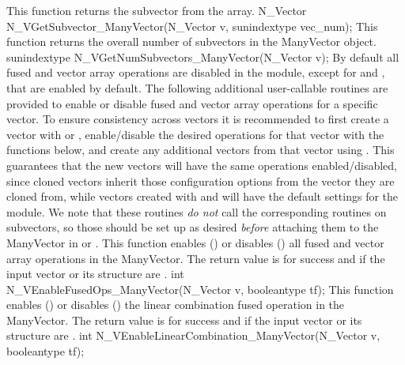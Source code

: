 {
  This function returns the  subvector from the {\nvector}
   array.
}
{
  N\_Vector N\_VGetSubvector\_ManyVector(N\_Vector v, sunindextype vec\_num);
}
{
  This function returns the overall number of subvectors in the
  ManyVector object.
}
{
  sunindextype N\_VGetNumSubvectors\_ManyVector(N\_Vector v);
}
By default all fused and vector array operations are disabled in the {\nvecmanyvector}
module, except for  and
, that are enabled by default. The
following additional user-callable routines are provided to enable or
disable fused and vector array operations for a specific vector. To
ensure consistency across vectors it is recommended to first create a
vector with  or ,
enable/disable the desired operations for that vector with the
functions below, and create any additional vectors from that vector
using . This guarantees that the new vectors will have
the same operations enabled/disabled, since cloned vectors inherit
those configuration options from the vector they are cloned from, while
vectors created with  and
 will have the default settings for the
{\nvecmanyvector} module.  We note that these routines \emph{do not} 
call the corresponding routines on subvectors, so those should be set up
as desired \emph{before} attaching them to the ManyVector in
 or .
{
  This function enables () or disables () all fused and
  vector array operations in the ManyVector. The return value is  for
  success and  if the input vector or its  structure are .
}
{
  int N\_VEnableFusedOps\_ManyVector(N\_Vector v, booleantype tf);
}
{
  This function enables () or disables () the linear
  combination fused operation in the ManyVector. The return value is  for
  success and  if the input vector or its  structure are .
}
{
  int N\_VEnableLinearCombination\_ManyVector(N\_Vector v, booleantype tf);
}
